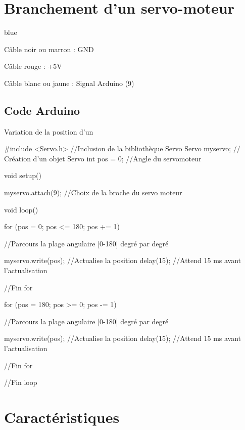 \section{Branchement d'un servo-moteur}

\begin{items}{blue}{\Bullet}
  \item Câble noir ou marron : GND 
  \item Câble rouge : +5V
  \item Câble blanc ou jaune : Signal Arduino (9)
\end{items}



\subsection{Code Arduino}


\begin{Cpp}{Variation de la position d'un \servo}

  #include <Servo.h>      //Inclusion de la bibliothèque Servo
  Servo myservo;  // Création d'un objet Servo
  int pos = 0;    //Angle du servomoteur
  
  void setup() {

    myservo.attach(9);  //Choix de la broche du servo moteur

  }
  
  void loop() {

    for (pos = 0; pos <= 180; pos += 1) { //Parcours la plage angulaire [0-180] degré par degré

      myservo.write(pos);              //Actualise la position 
      delay(15);                       //Attend 15 ms avant l'actualisation

    }//Fin for

    for (pos = 180; pos >= 0; pos -= 1) {     //Parcours la plage angulaire [0-180] degré par degré

      myservo.write(pos);              //Actualise la position 
      delay(15);                       //Attend 15 ms avant l'actualisation

    }//Fin for
  }//Fin loop

\end{Cpp}


\section{Caractéristiques}


